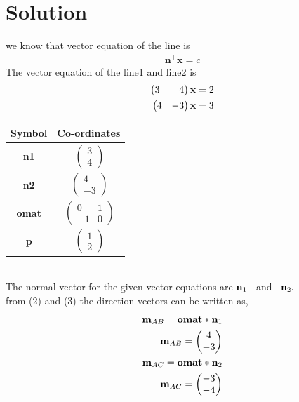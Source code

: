     
   


 \section{Solution}
we know that vector equation of the line is 
\begin{align}
 \textbf{n}^{\top}\textbf{x}=c
\end{align}
The vector equation of the line1 and line2 is
\begin{align}
  \begin{pmatrix}3 & & 4\end{pmatrix}\textbf{x}=2
 \\ \begin{pmatrix}4 & -3\end{pmatrix}\textbf{x}=3
\end{align}
\centering
\begin{tabular}{|c |c |}
     \hline %
	\large\textbf{Symbol} & \large\textbf{Co-ordinates}  \\
       \hline
	\large \textbf{n1} & $\ \begin{pmatrix} 3\\ 4 \end{pmatrix}$  \\
        \hline
	\large \textbf{n2} & $\ \begin{pmatrix} 4\\ -3 \end{pmatrix}$  \\
        \hline
	 \large \textbf{omat} & $\ \begin{pmatrix}0 & 1 \\ -1 & 0 \end{pmatrix}$ \\
       \hline
     \large \textbf{p} & $\ \begin{pmatrix} 1\\ 2 \end{pmatrix}$  \\
        \hline
    \end{tabular}
\\The normal vector for the given vector equations are $ \textbf{n}_{1} \hspace{0.3cm}$and$\hspace{0.3cm}\textbf{n}_{2}. $\\
from (2) and (3) the direction vectors can be written as,
            \\
            \begin{align}
 \textbf{m}_{AB}= \textbf{omat}*\textbf{n}_{1}\\
 \textbf{m}_{AB}=\begin{pmatrix}4\\ -3\end{pmatrix} \\
\textbf{m}_{AC}= \textbf{omat}*\textbf{n}_{2}\\
\textbf{m}_{AC}=\begin{pmatrix}-3\\ -4\end{pmatrix} \\
\end{align}
